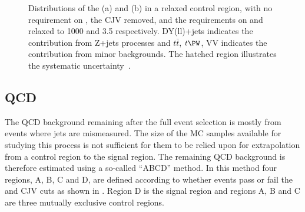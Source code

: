 \begin{figure}
  \caption{Distributions of the \METnoMU (a) and \Mjj (b) in a relaxed \PZ control region, with no requirement on \dphijj, the \ac{CJV} removed, and the requirements on \Mjj and \detajj relaxed to 1000 \GeV and 3.5 respectively. DY(ll)+jets indicates the contribution from Z+jets processes and $t\bar{t}$, $t\PW$, VV indicates the contribution from minor backgrounds. The hatched region illustrates the systematic uncertainty~\cite{Chatrchyan:2014tja}.}
  \label{fig:promptznunu}
\end{figure}




\subsection{QCD}
\label{sec:promptacQCD}
The \ac{QCD} background remaining after the full event selection is mostly from events where jets are mismeasured. The size of the \ac{MC} samples available for studying this process is not sufficient for them to be relied upon for extrapolation from a control region to the signal region. The remaining \ac{QCD} background is therefore estimated using a so-called ``ABCD'' method. In this method four regions, A, B, C and D, are defined according to whether events pass or fail the \METnoMU and \ac{CJV} cuts as shown in . Region D is the signal region and regions A, B and C are three mutually exclusive control regions.

